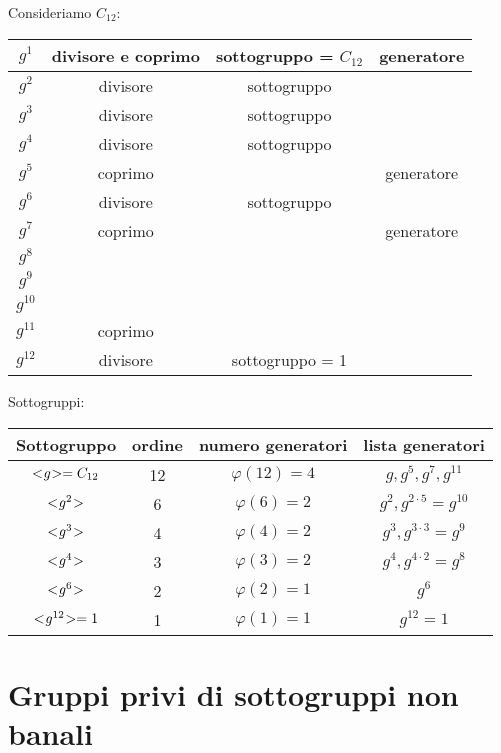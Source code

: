 Consideriamo $C_{12}$:

\begin{center}
	\begin{tabular}{cccc}
		\toprule
		$g^1$ & divisore e coprimo & sottogruppo = $C_{12}$ & generatore \\
		\midrule
		$g^2$ & divisore & sottogruppo & \\
		\midrule
		$g^3$ & divisore & sottogruppo & \\
		\midrule
		$g^4$ & divisore & sottogruppo & \\
		\midrule
		$g^5$ & coprimo & & generatore \\
		\midrule
		$g^6$ & divisore & sottogruppo & \\
		\midrule
		$g^7$ & coprimo & & generatore \\
		\midrule
		$g^8$ & & & \\
		\midrule
		$g^9$ & & & \\
		\midrule
		$g^{10}$ & & & \\
		\midrule
		$g^{11}$ & coprimo & & \\
		\midrule
		$g^{12}$ & divisore & sottogruppo = 1 & \\
		\bottomrule
	\end{tabular}
\end{center}

Sottogruppi:

\begin{center}
	\begin{tabular}{cccc}
		\toprule
		Sottogruppo & ordine & numero generatori & lista generatori \\
		\midrule
		$< \negmedspace g \negmedspace > = C_{12}$ & 12 & $\varphi(12) = 4$ & $g, g^5, g^7, g^{11}$ \\
		$< \negmedspace g^2 \negmedspace >$ & 6 & $\varphi(6) = 2$ & $g^2, g^{2 \cdot 5} = g^{10}$ \\
		$< \negmedspace g^3 \negmedspace >$ & 4 & $\varphi(4) = 2$ & $g^3, g^{3 \cdot 3} = g^9$ \\
		$< \negmedspace g^4 \negmedspace >$ & 3 & $\varphi(3) = 2$ & $g^4, g^{4 \cdot 2} = g^8$ \\
		$< \negmedspace g^6 \negmedspace >$ & 2 & $\varphi(2) = 1$ & $g^6$ \\
		$< \negmedspace g^{12} \negmedspace > = 1$ & 1 & $\varphi(1) = 1$ & $g^{12} = 1$ \\
		\bottomrule 
	\end{tabular}
\end{center}

\section{Gruppi privi di sottogruppi non banali}

